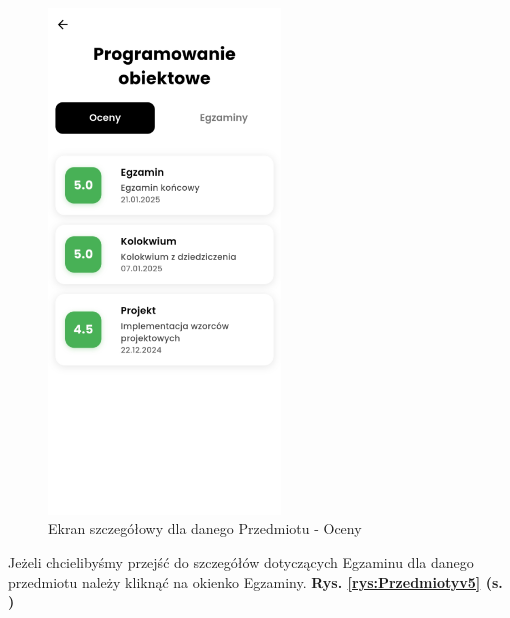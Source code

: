 \begin{figure}[h!]
	\centering
	\includegraphics[width=0.55\textwidth]{rys/przedmiotyv4.png}
	\caption{Ekran szczegółowy dla danego Przedmiotu - Oceny}
	\label{rys:Przedmiotyv4}
\end{figure}
\newpage
Jeżeli chcielibyśmy przejść do szczegółów dotyczących Egzaminu dla danego przedmiotu należy kliknąć na okienko Egzaminy.  \textbf{Rys. \ref{rys:Przedmiotyv5} (s. \pageref{rys:Przedmiotyv5})}
